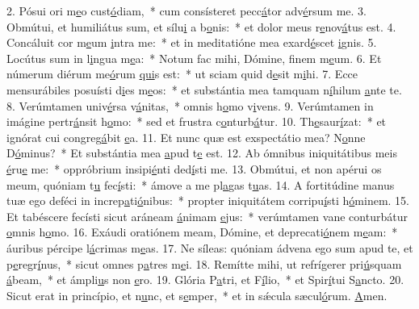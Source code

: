 2. Pósui ori m\uline{e}o cust\uline{ó}diam,~* cum consísteret pecc\uline{á}tor adv\uline{é}rsum me.
3. Obmútui, et humiliátus sum, et sílu\uline{i} a b\uline{o}nis:~* et dolor meus r\uline{e}nov\uline{á}tus est.
4. Concáluit cor m\uline{e}um \uline{i}ntra me:~* et in meditatióne mea exard\uline{é}scet \uline{i}gnis.
5. Locútus sum in l\uline{i}ngua m\uline{e}a:~* Notum fac mihi, Dómine, f\uline{i}nem m\uline{e}um.
6. Et númerum diérum me\uline{ó}rum \uline{qui}s est:~* ut sciam quid d\uline{e}sit m\uline{i}hi.
7. Ecce mensurábiles posuísti d\uline{i}es m\uline{e}os:~* et substántia mea tamquam n\uline{í}hilum \uline{a}nte te.
8. Verúmtamen univ\uline{é}rsa v\uline{á}nitas,~* omnis h\uline{o}mo v\uline{i}vens.
9. Verúmtamen in imágine pertr\uline{á}nsit h\uline{o}mo:~* sed et frustra c\uline{o}nturb\uline{á}tur.
10. Th\uline{e}saur\uline{í}zat:~* et ignórat cui congreg\uline{á}bit \uline{e}a.
11. Et nunc quæ est exspectátio mea? N\uline{o}nne D\uline{ó}minus?~* Et substántia mea \uline{a}pud t\uline{e} est.
12. Ab ómnibus iniquitátibus meis \uline{é}ru\uline{e} me:~* oppróbrium insipi\uline{é}nti ded\uline{í}sti me.
13. Obmútui, et non apérui os meum, quóniam t\uline{u} fec\uline{í}sti:~* ámove a me pl\uline{a}gas t\uline{u}as.
14. A fortitúdine manus tuæ ego deféci in increp\uline{a}ti\uline{ó}nibus:~* propter iniquitátem corripu\uline{í}sti h\uline{ó}minem.
15. Et tabéscere fecísti sicut aráneam \uline{á}nimam \uline{e}jus:~* verúmtamen vane conturbátur \uline{o}mnis h\uline{o}mo.
16. Exáudi oratiónem meam, Dómine, et deprecati\uline{ó}nem m\uline{e}am:~* áuribus pércipe l\uline{á}crimas m\uline{e}as.
17. Ne síleas: quóniam ádvena ego sum apud te, et p\uline{e}regr\uline{í}nus,~* sicut omnes p\uline{a}tres m\uline{e}i.
18. Remítte mihi, ut refrígerer pri\uline{ú}squam \uline{á}beam,~* et ámpli\uline{u}s non \uline{e}ro.
19. Glória P\uline{a}tri, et F\uline{í}lio,~* et Spir\uline{í}tui S\uline{a}ncto.
20. Sicut erat in princípio, et n\uline{u}nc, et s\uline{e}mper,~* et in sǽcula sæcul\uline{ó}rum. \uline{A}men.
